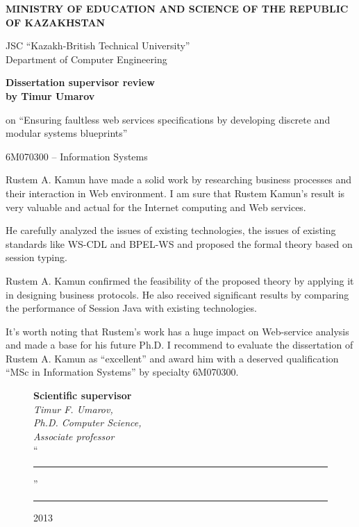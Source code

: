 \pagebreak

\thispagestyle{empty}

\begin{centering}
{\bf{\MakeUppercase{Ministry of education and science of the republic of Kazakhstan}}

\vspace{14pt}

JSC ``Kazakh-British Technical University''\\
Department of Computer Engineering}
\vspace{14pt}

{\bf
Dissertation supervisor review\\
by Timur Umarov
}

on ``Ensuring faultless web services specifications by developing discrete and modular systems blueprints''

\vspace{14pt}
\small 6M070300 -- Information Systems

\end{centering}



Rustem A. Kamun have made a solid work by researching business processes and their interaction in Web environment. I am sure that Rustem Kamun’s result is very valuable and actual for the Internet computing and Web services.

He carefully analyzed the issues of existing technologies, the issues of existing standards like WS-CDL and BPEL-WS and proposed the formal theory based on session typing.

Rustem A. Kamun confirmed the feasibility of the proposed theory by applying it in designing business protocols. He also received significant results by comparing the performance of Session Java with existing technologies.

It’s worth noting that Rustem's work has a huge impact on Web-service analysis and made a base for his future Ph.D.
I recommend to evaluate the dissertation of Rustem A. Kamun as ``excellent'' and award him with a deserved qualification ``MSc in Information Systems'' by specialty 6M070300.


\begin{figure}[ht]
\begin{minipage}[t]{0.6\linewidth}
{\bf Scientific supervisor}\\

{\em Timur F. Umarov,\\
Ph.D. Computer Science,\\
Associate professor}\\

``\rule{2em}{0.4pt}'' \rule{8em}{0.4pt} 2013\\
\end{minipage}
\end{figure}

\pagebreak